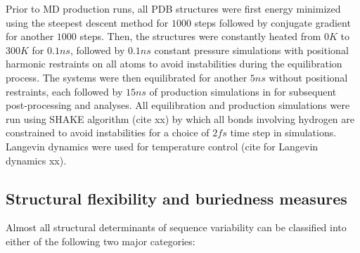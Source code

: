 \documentclass[12pt]{article}
\begin{document}
Prior to MD production runs, all PDB structures were first energy minimized using the steepest descent method for $1000$ steps followed by conjugate gradient for another $1000$ steps. Then, the structures were constantly heated from $0K$ to $300K$ for $0.1ns$, followed by $0.1ns$ constant pressure simulations with positional harmonic restraints on all atoms to avoid instabilities during the equilibration process. The systems were then equilibrated for another $5ns$ without positional restraints, each followed by $15ns$ of production simulations in for subsequent post-processing and analyses. All equilibration and production simulations were run using SHAKE algorithm (cite xx) by which all bonds involving hydrogen are constrained to avoid instabilities for a choice of $2fs$ time step in simulations. Langevin dynamics were used for temperature control (cite for Langevin dynamics xx).

\subsection*{Structural flexibility and buriedness measures}

Almost all structural determinants of sequence variability can be classified into either of the following two major categories:
\end{document}
